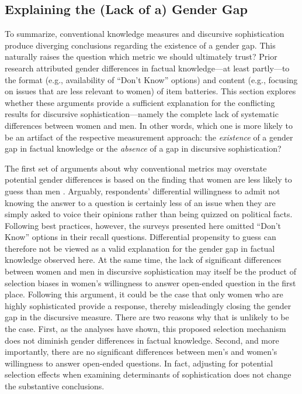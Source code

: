 

\subsection*{Explaining the (Lack of a) Gender Gap}

To summarize, conventional knowledge measures and discursive sophistication produce diverging conclusions regarding the existence of a gender gap. This naturally raises the question which metric we should ultimately trust? Prior research attributed gender differences in factual knowledge---at least partly---to the format (e.g., availability of ``Don't Know'' options) and content (e.g., focusing on issues that are less relevant to women) of item batteries. This section explores whether these arguments provide a sufficient explanation for the conflicting results for discursive sophistication---namely the complete lack of systematic differences between women and men. In other words, which one is more likely to be an artifact of the respective measurement approach: the \textit{existence} of a gender gap in factual knowledge or the \textit{absence} of a gap in discursive sophistication?

The first set of arguments about why conventional metrics may overstate potential gender differences is based on the finding that women are less likely to guess than men \citep{mondak2004knowledge}. Arguably, respondents' differential willingness to admit not knowing the answer to a question is certainly less of an issue when they are simply asked to voice their opinions rather than being quizzed on political facts. Following best practices, however, the surveys presented here omitted ``Don't Know'' options in their recall questions. Differential propensity to guess can therefore not be viewed as a valid explanation for the gender gap in factual knowledge observed here. At the same time, the lack of significant differences between women and men in discursive sophistication may itself be the product of selection biases in women's willingness to answer open-ended question in the first place. Following this argument, it could be the case that only women who are highly sophisticated provide a response, thereby misleadingly closing the gender gap in the discursive measure. There are two reasons why that is unlikely to be the case. First, as the analyses have shown, this proposed selection mechanism does not diminish gender differences in factual knowledge. Second, and more importantly, there are no significant differences between men's and women's willingness to answer open-ended questions. In fact, adjusting for potential selection effects when examining determinants of sophistication does not change the substantive conclusions.

